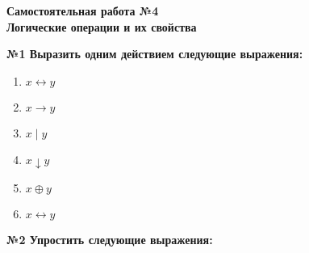 



    \begin{center}
        \textbf{
            Самостоятельная работа №4\\Логические операции и их свойства
        }
    \end{center}

    \begin{center}
        \textbf{№1 Выразить одним действием следующие выражения:}
    \end{center}

    \begin{minipage}[t]{0.4\textwidth}
        \begin{enumerate}
            \item $x \leftrightarrow y$
            \item $x \rightarrow y$
            \item $x \mid y$
        \end{enumerate}
    \end{minipage}
    \begin{minipage}[t]{0.4\textwidth}
        \begin{enumerate}
            \setcounter{enumi}{3}
            \item $x \downarrow y$
            \item $x \oplus y$
            \item $x \leftrightarrow y$
        \end{enumerate}
    \end{minipage}

    \begin{center}
        \textbf{№2 Упростить следующие выражения:}
    \end{center}

